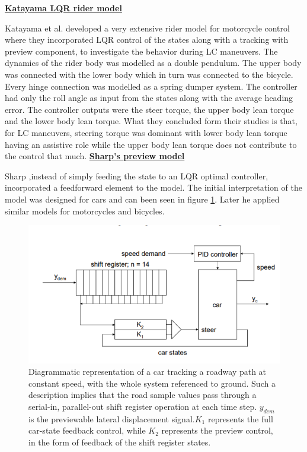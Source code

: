 \bigbreak
\underline{\textbf{Katayama LQR rider model \cite{katayama1988control}}}
\newline
\par
Katayama et al. developed a very extensive rider model for motorcycle control where they incorporated LQR control of the states along with a tracking with preview component, to investigate the behavior during LC maneuvers. The dynamics of the rider body was modelled as a double pendulum. The upper body was connected with the lower body which in turn was connected to the bicycle. Every hinge connection was modelled as a spring dumper system. The controller had only the roll angle as input from the states along with the average heading error. The controller outputs were the steer torque, the upper body lean torque and the lower body lean torque. What they concluded form their studies is that, for LC maneuvers, steering torque was dominant with lower body lean torque having an assistive role while the upper body lean torque does not contribute to the control that much.
\bigbreak
\underline{\textbf{Sharp’s preview model}}
\newline
\par
Sharp ,instead of simply feeding the state to an LQR optimal controller, incorporated a feedforward element to the model. The initial interpretation of the model was designed for cars and can been seen in figure \ref{fig:figure10}. Later he applied similar  models for motorcycles \cite{sharp2007motorcycle,sharp2006optimal} and bicycles\cite{sharp2008stability,sharp2007optimal}.
\begin{figure}[ht]
    \centering
    \includegraphics[scale=0.55]{images/sharp_model.png}
    \caption{Diagrammatic representation of a car tracking a roadway path at constant speed, with the whole system referenced to ground. Such a description implies that the road sample values pass through a serial-in, parallel-out shift register operation at each time step. \ensuremath{y_{dem}} is the previewable lateral displacement signal.\ensuremath{K_1} represents the full car-state feedback control, while \ensuremath{K_2} represents the preview control, in the form of feedback of the shift register states\cite{thommyppillai2009advances}. }
    \label{fig:figure10}
\end{figure}

